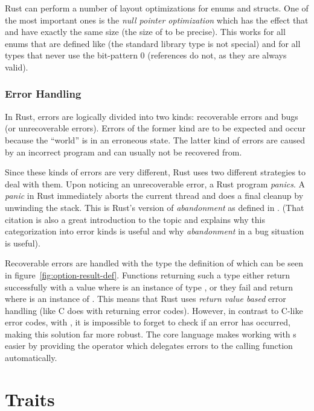 Rust can perform a number of layout optimizations for enums and structs.
One of the most important ones is the \emph{null pointer optimization} which has the effect that  and  have exactly the same size (the size of  to be precise).
This works for all enums that are defined like  (the standard library type is not special) and for all types that never use the bit-pattern 0 (references do not, as they are always valid).


\subsubsection*{Error Handling}

In Rust, errors are logically divided into two kinds: recoverable errors and bugs (or unrecoverable errors).
Errors of the former kind are to be expected and occur because the \enquote{world} is in an erroneous state.
The latter kind of errors are caused by an incorrect program and can usually not be recovered from.

Since these kinds of errors are very different, Rust uses two different strategies to deal with them.
Upon noticing an unrecoverable error, a Rust program \emph{panics}.
A \emph{panic} in Rust immediately aborts the current thread and does a final cleanup by unwinding the stack.
This is Rust's version of \emph{abandonment} as defined in \cite{duffy2016error}.
(That citation is also a great introduction to the topic and explains why this categorization into error kinds is useful and why \emph{abandonment} in a bug situation is useful).

Recoverable errors are handled with the  type the definition of which can be seen in figure~\ref{fig:option-result-def}.
Functions returning such a type either return successfully with a value  where  is an instance of type , or they fail and return  where  is an instance of .
This means that Rust uses \emph{return value based} error handling (like C does with returning error codes).
However, in contrast to C-like error codes, with , it is impossible to forget to check if an error has occurred, making this solution far more robust.
The core language makes working with s easier by providing the  operator which delegates errors to the calling function automatically.


\section{Traits}

